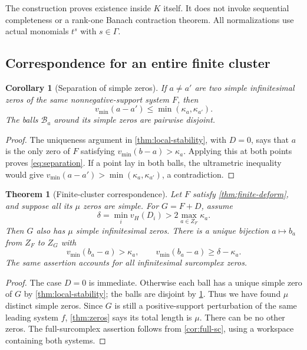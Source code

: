 \documentclass[11pt,letterpaper]{article}
\newtheorem{theorem}{Theorem}[section]
\newtheorem{corollary}[corollary]{Corollary}
\theoremstyle{definition}
\theoremstyle{remark}
\newcommand{\vH}{v_{\!H}}
\newcommand{\vmin}{v_{\min}}
\numberwithin{equation}{section}
\begin{document}
The construction proves existence inside $K$ itself. It does not invoke sequential completeness or a rank-one Banach contraction theorem. All normalizations use actual monomials $t^s$ with $s\in\Gamma$.

\subsection{Correspondence for an entire finite cluster}
\begin{corollary}[Separation of simple zeros]\label{cor:separation}
If $a\ne a'$ are two simple infinitesimal zeros of the same nonnegative-support system $F$, then
\begin{equation}\label{eq:separation}
 \vmin(a-a')\le\min(\kappa_a,\kappa_{a'}).
\end{equation}
The balls $\mathcal B_a$ around its simple zeros are pairwise disjoint.
\end{corollary}
\begin{proof}
The uniqueness argument in \cref{thm:local-stability}, with $D=0$, says that $a$ is the only zero of $F$ satisfying $\vmin(b-a)>\kappa_a$. Applying this at both points proves \eqref{eq:separation}. If a point lay in both balls, the ultrametric inequality would give $\vmin(a-a')>\min(\kappa_a,\kappa_{a'})$, a contradiction.
\end{proof}

\begin{theorem}[Finite-cluster correspondence]\label{thm:cluster-stability}
Let $F$ satisfy \cref{thm:finite-deform}, and suppose all its $\mu$ zeros are simple. For $G=F+D$, assume
\begin{equation}\label{eq:global-threshold}
 \delta=\min_i\vH(D_i)>2\max_{a\in Z_F}\kappa_a.
\end{equation}
Then $G$ also has $\mu$ simple infinitesimal zeros. There is a unique bijection $a\mapsto b_a$ from $Z_F$ to $Z_G$ with
\[
 \vmin(b_a-a)>\kappa_a,
 \qquad \vmin(b_a-a)\ge\delta-\kappa_a.
\]
The same assertion accounts for all infinitesimal surcomplex zeros.
\end{theorem}
\begin{proof}
The case $D=0$ is immediate. Otherwise each ball has a unique simple zero of $G$ by \cref{thm:local-stability}; the balls are disjoint by \cref{cor:separation}. Thus we have found $\mu$ distinct simple zeros. Since $G$ is still a positive-support perturbation of the same leading system $f$, \cref{thm:zeros} says its total length is $\mu$. There can be no other zeros. The full-surcomplex assertion follows from \cref{cor:full-sc}, using a workspace containing both systems.
\end{proof}
\end{document}
